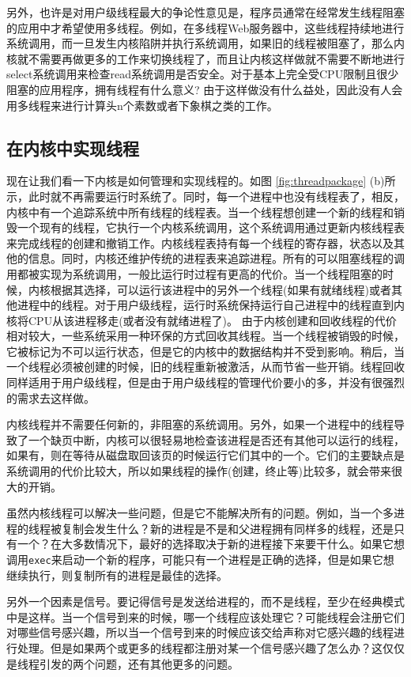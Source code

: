 	另外，也许是对用户级线程最大的争论性意见是，程序员通常在经常发生线程阻塞的应用中才希望使用多线程。例如，在多线程Web服务器中，这些线程持续地进行系统调用，而一旦发生内核陷阱并执行系统调用，如果旧的线程被阻塞了，那么内核就不需要再做更多的工作来切换线程了，而且让内核这样做就不需要不断地进行select系统调用来检查read系统调用是否安全。对于基本上完全受CPU限制且很少阻塞的应用程序，拥有线程有什么意义? 由于这样做没有什么益处，因此没有人会用多线程来进行计算头n个素数或者下象棋之类的工作。
	
	\subsection{在内核中实现线程}
	
	现在让我们看一下内核是如何管理和实现线程的。如图 \ref{fig:threadpackage} (b)所示，此时就不再需要运行时系统了。同时，每一个进程中也没有线程表了，相反，内核中有一个追踪系统中所有线程的线程表。当一个线程想创建一个新的线程和销毁一个现有的线程，它执行一个内核系统调用，这个系统调用通过更新内核线程表来完成线程的创建和撤销工作。内核线程表持有每一个线程的寄存器，状态以及其他的信息。同时，内核还维护传统的进程表来追踪进程。所有的可以阻塞线程的调用都被实现为系统调用，一般比运行时过程有更高的代价。当一个线程阻塞的时候，内核根据其选择，可以运行该进程中的另外一个线程(如果有就绪线程)或者其他进程中的线程。对于用户级线程，运行时系统保持运行自己进程中的线程直到内核将CPU从该进程移走(或者没有就绪进程了)。
	由于内核创建和回收线程的代价相对较大，一些系统采用一种环保的方式回收其线程。当一个线程被销毁的时候，它被标记为不可以运行状态，但是它的内核中的数据结构并不受到影响。稍后，当一个线程必须被创建的时候，旧的线程重新被激活，从而节省一些开销。线程回收同样适用于用户级线程，但是由于用户级线程的管理代价要小的多，并没有很强烈的需求去这样做。
	
	内核线程并不需要任何新的，非阻塞的系统调用。另外，如果一个进程中的线程导致了一个缺页中断，内核可以很轻易地检查该进程是否还有其他可以运行的线程，如果有，则在等待从磁盘取回该页的时候运行它们其中的一个。它们的主要缺点是系统调用的代价比较大，所以如果线程的操作(创建，终止等)比较多，就会带来很大的开销。
	
	虽然内核线程可以解决一些问题，但是它不能解决所有的问题。例如，当一个多进程的线程被复制会发生什么？新的进程是不是和父进程拥有同样多的线程，还是只有一个？在大多数情况下，最好的选择取决于新的进程接下来要干什么。如果它想调用\texttt{exec}来启动一个新的程序，可能只有一个进程是正确的选择，但是如果它想继续执行，则复制所有的进程是最佳的选择。
	
	另外一个因素是信号。要记得信号是发送给进程的，而不是线程，至少在经典模式中是这样。当一个信号到来的时候，哪一个线程应该处理它？可能线程会注册它们对哪些信号感兴趣，所以当一个信号到来的时候应该交给声称对它感兴趣的线程进行处理。但是如果两个或更多的线程都注册对某一个信号感兴趣了怎么办？这仅仅是线程引发的两个问题，还有其他更多的问题。
	
